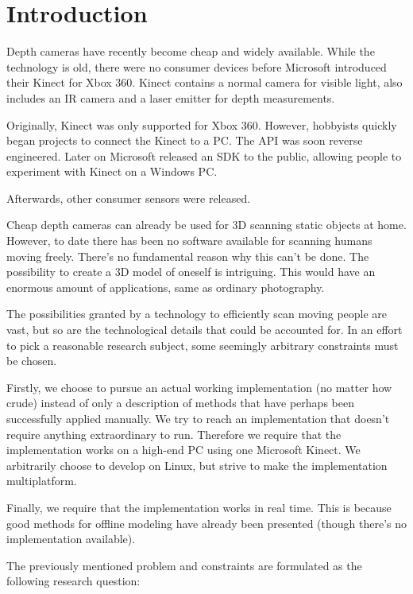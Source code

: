 \chapter{Introduction}

 Depth cameras have recently become cheap and widely available. While the technology is old, there were no consumer devices before Microsoft introduced their Kinect for Xbox 360. Kinect contains a normal camera for visible light,  also includes an IR camera and a laser emitter for depth measurements. 

Originally, Kinect was only supported for Xbox 360. However, hobbyists quickly began projects to connect the Kinect to a PC. The API was soon reverse engineered. Later on Microsoft released an SDK to the public, allowing people to experiment with Kinect on a Windows PC.

Afterwards, other consumer sensors were released. 

Cheap depth cameras can already be used for 3D scanning static objects at home. However, to date there has been no software available for scanning humans moving freely. There's no fundamental reason why this can't be done. The possibility to create a 3D model of oneself is intriguing. This would have an enormous amount of applications, same as ordinary photography.


The possibilities granted by a technology to efficiently scan moving people are vast, but so are the technological details that could be accounted for. In an effort to pick a reasonable research subject, some seemingly arbitrary constraints must be chosen.

Firstly, we choose to pursue an actual working implementation (no matter how crude) instead of only a description of methods that have perhaps been successfully applied manually. We try to reach an implementation that doesn't require anything extraordinary to run. Therefore we require that the implementation works on a high-end PC using one Microsoft Kinect. We arbitrarily choose to develop on Linux, but strive to make the implementation multiplatform.

Finally, we require that the implementation works in real time. This is because good methods for offline modeling have already been presented (though there's no implementation available).

The previously mentioned problem and constraints are formulated as the following research question:

